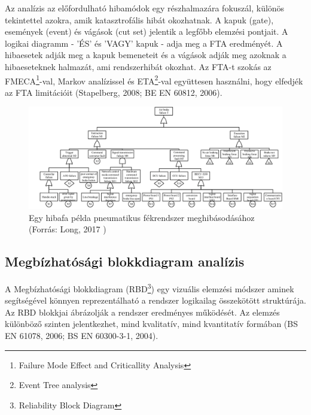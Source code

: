 Az analízis az előfordulható hibamódok egy részhalmazára fokuszál, különös tekintettel azokra, amik katasztrofális hibát okozhatnak.
A kapuk (gate), események (event) és vágások (cut set) jelentik a legfőbb elemzési pontjait.
A logikai diagramm - 'ÉS' és 'VAGY' kapuk - adja meg a FTA eredményét.
A hibaesetek adják meg a kapuk bemeneteit és a vágások adják meg azoknak a hibaeseteknek halmazát, ami rendszerhibát okozhat.
Az FTA-t szokás az FMECA\footnote{Failure Mode Effect and Criticallity Analysis}-val, Markov analízissel és ETA\footnote{Event Tree analysis}-val együttesen használni, hogy elfedjék az FTA limitációit (Stapelberg, 2008; BE EN 60812, 2006).

\begin{figure}
    \footnotesize
    \centering
    \includegraphics[width=150mm, keepaspectratio]{figures/fta1.png}
    \caption{Egy hibafa példa pneumatikus fékrendszer meghibásodásához (Forrás: Long, 2017 \cite{Long2017BrakingSM})}
\end{figure}

\subsection{Megbízhatósági blokkdiagram analízis}
A Megbízhatósági blokkdiagram (RBD\footnote{Reliability Block Diagram}) egy vizuális elemzési módszer aminek segítségével könnyen reprezentálható a rendszer logikailag összekötött struktúrája.
Az RBD blokkjai ábrázolják a rendszer eredményes működését. Az elemzés különböző szinten jelentkezhet, mind kvalitatív, mind kvantitatív formában (BS EN 61078, 2006; BS EN 60300-3-1, 2004).

